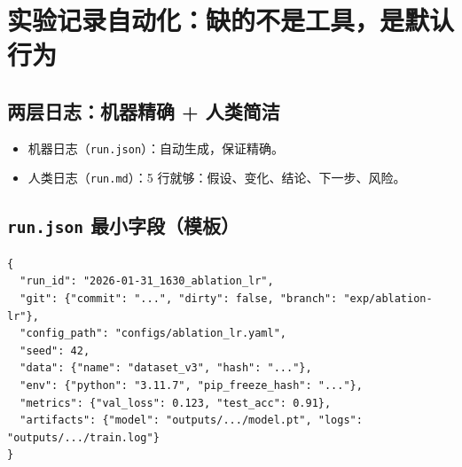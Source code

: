 \chapter{实验记录自动化：缺的不是工具，是默认行为}
\label{ch:logging}
\section{两层日志：机器精确 + 人类简洁}
\begin{itemize}
  \item 机器日志（\texttt{run.json}）：自动生成，保证精确。
  \item 人类日志（\texttt{run.md}）：5 行就够：假设、变化、结论、下一步、风险。
\end{itemize}

\section{\texttt{run.json} 最小字段（模板）}
\begin{verbatim}
{
  "run_id": "2026-01-31_1630_ablation_lr",
  "git": {"commit": "...", "dirty": false, "branch": "exp/ablation-lr"},
  "config_path": "configs/ablation_lr.yaml",
  "seed": 42,
  "data": {"name": "dataset_v3", "hash": "..."},
  "env": {"python": "3.11.7", "pip_freeze_hash": "..."},
  "metrics": {"val_loss": 0.123, "test_acc": 0.91},
  "artifacts": {"model": "outputs/.../model.pt", "logs": "outputs/.../train.log"}
}
\end{verbatim}